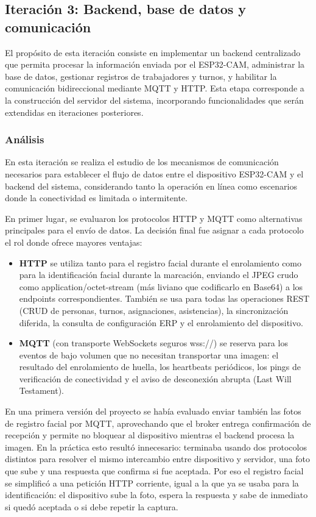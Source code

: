 \subsection{Iteración 3: Backend, base de datos y comunicación}

El propósito de esta iteración consiste en implementar un backend centralizado que permita procesar la información enviada por el ESP32-CAM, administrar la base de datos, gestionar registros de trabajadores y turnos, y habilitar la comunicación bidireccional mediante MQTT y HTTP. Esta etapa corresponde a la construcción del servidor del sistema, incorporando funcionalidades que serán extendidas en iteraciones posteriores.

\subsubsection{Análisis}

En esta iteración se realiza el estudio de los mecanismos de comunicación necesarios para establecer el flujo de datos entre el dispositivo ESP32-CAM y el backend del sistema, considerando tanto la operación en línea como escenarios donde la conectividad es limitada o intermitente.

En primer lugar, se evaluaron los protocolos HTTP y MQTT como alternativas principales para el envío de datos. La decisión final fue asignar a cada protocolo el rol donde ofrece mayores ventajas:

\begin{itemize}
    \item \textbf{HTTP} se utiliza tanto para el registro facial durante el enrolamiento como para la identificación facial durante la marcación, enviando el JPEG crudo como application/octet-stream (más liviano que codificarlo en Base64) a los endpoints correspondientes. También se usa para todas las operaciones REST (CRUD de personas, turnos, asignaciones, asistencias), la sincronización diferida, la consulta de configuración ERP y el enrolamiento del dispositivo.
    \item \textbf{MQTT} (con transporte WebSockets seguros wss://) se reserva para los eventos de bajo volumen que no necesitan transportar una imagen: el resultado del enrolamiento de huella, los heartbeats periódicos, los pings de verificación de conectividad y el aviso de desconexión abrupta (Last Will Testament).
\end{itemize}

En una primera versión del proyecto se había evaluado enviar también las fotos de registro facial por MQTT, aprovechando que el broker entrega confirmación de recepción y permite no bloquear al dispositivo mientras el backend procesa la imagen. En la práctica esto resultó innecesario: terminaba usando dos protocolos distintos para resolver el mismo intercambio entre dispositivo y servidor, una foto que sube y una respuesta que confirma si fue aceptada. Por eso el registro facial se simplificó a una petición HTTP corriente, igual a la que ya se usaba para la identificación: el dispositivo sube la foto, espera la respuesta y sabe de inmediato si quedó aceptada o si debe repetir la captura.

